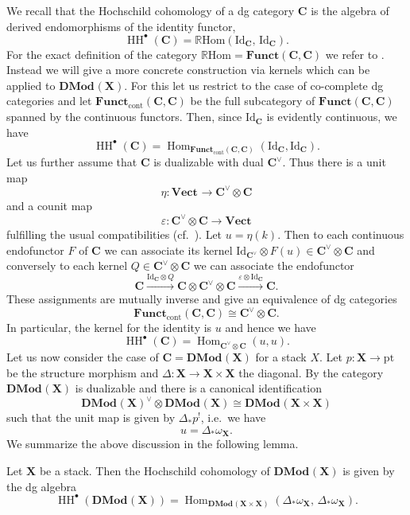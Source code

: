 \documentclass[english]{ck-article}
\newcommand\cat{\mathbf}
\newcommand\catVect[1][]{\cat{Vect}_{#1}}
\newcommand\catDMod[2][]{\cat{DMod}_{#1}(#2)}
\DeclareMathOperator\Hom{Hom}
\newcommand\id[1][]{{\mathrm{Id}_{#1}}}
\let\stack\mathbf
\newcommand\pt{\mathrm{pt}}
\newcommand\dual{\vee}
\newcommand\cx\bullet
\newcommand\ΓdR{Γ_{\mkern-4mu\dR}}
\newcommand{\HCoh}{\operatorname{HH}^\cx}
\newcommand\Γsub[1]{\Gamma_{\mkern-3mu#1}}
\begin{document}
We recall that the Hochschild cohomology of a dg category $\cat C$ is the algebra of derived endomorphisms of the identity functor,
\[
    \HCoh(\cat C) = \mathbb{R}\mathrm{Hom}(\id[\cat C],\, \id[\cat C]).
\]
For the exact definition of the category $\mathbb{R}\mathrm{Hom} = \cat{Funct}(\cat C, \cat C)$ we refer to \cite{Keller:2006:OnDGCategories}.
Instead we will give a more concrete construction via kernels which can be applied to $\catDMod{\stack X}$.
For this let us restrict to the case of co-complete dg categories and let $\cat{Funct}_{\mathrm{cont}}(\cat C, \cat C)$ be the full subcategory of $\cat{Funct}(\cat C, \cat C)$ spanned by the continuous functors.
Then, since $\id[\cat C]$ is evidently continuous, we have
\[
    \HCoh(\cat C) =
    \Hom_{\cat{Funct}_{\mathrm{cont}}(\cat C, \cat C)}(\id[\cat C], \id[\cat C]).
\]
Let us further assume that $\cat C$ is dualizable with dual $\cat C^\dual$.
Thus there is a unit map
\[
    η\colon \catVect → \cat C^\dual \otimes \cat C
\]
and a counit map
\[
    ε\colon \cat C^\dual \otimes \cat C → \catVect
\]
fulfilling the usual compatibilities (cf.~\cite[Section~2]{BenZviNadler:arXiv:NonlinearTraces}).
Let $u = η(k)$.
Then to each continuous endofunctor $F$ of $\cat C$ we can associate its kernel $\id[\cat C^\dual] \otimes F(u) ∈ \cat C^\dual \otimes \cat C$ and conversely to each kernel $Q ∈ \cat C^\dual \otimes \cat C$ we can associate the endofunctor
\[
    \cat C
    \xrightarrow{\id[\cat C] \otimes Q}
    \cat C \otimes \cat C^\dual \otimes \cat C
    \xrightarrow{ε \otimes \id[\cat C]}
    \cat C.
\]
These assignments are mutually inverse and give an equivalence of dg categories
\[
    \cat{Funct}_{\mathrm{cont}}(\cat C, \cat C)
    \cong
    \cat C^\dual \otimes \cat C.
\]
In particular, the kernel for the identity is $u$ and hence we have
\[
    \HCoh(\cat C) =
    \Hom_{\cat C^\dual \otimes \cat C}(u, u).
\]
Let us now consider the case of $\cat C = \catDMod{\stack X}$ for a stack $X$.
Let $p\colon \stack X → \pt$ be the structure morphism and $Δ\colon \stack X → \stack X × \stack X$ the diagonal.
By \cite[Section~8.4]{DrinfeldGaitsgory:2013:FinitenessQuestions} the category $\catDMod{\stack X}$ is dualizable and there is a canonical identification
\[
    \catDMod{\stack X}^\dual \otimes \catDMod{\stack X} \cong \catDMod{\stack X × \stack X}
\]
such that the unit map is given by $Δ_*p^!$, i.e.~we have
\[
    u = Δ_*ω_{\stack X}.
\]
We summarize the above discussion in the following lemma.

\begin{Lem}\label{lem:pre:hcoh}
    Let $\stack X$ be a stack.
    Then the Hochschild cohomology of $\catDMod{\stack X}$ is given by the dg algebra
    \[
        \HCoh(\catDMod{\stack X}) =
        \Hom_{\catDMod{\stack X × \stack X}}(Δ_*ω_{\stack X},\, Δ_*ω_{\stack X}).
    \]
\end{Lem}
\end{document}
